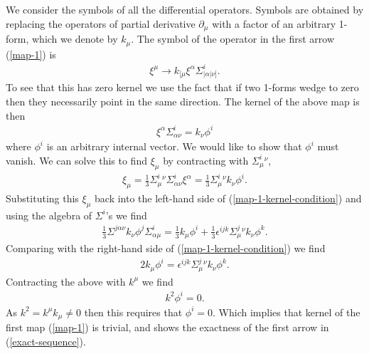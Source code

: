 \documentclass[10pt]{report}
\theoremstyle{definition}
\begin{document}
We consider the symbols of all the differential operators. Symbols are obtained by replacing the operators of partial derivative $\partial_\mu$ with a factor of an arbitrary 1-form, which we denote by $k_\mu$. The symbol of the operator in the first arrow (\ref{map-1}) is
\begin{align}
\xi^\mu \to k_{[\mu} \xi^\alpha \Sigma^i_{|\alpha|\nu]}.
\end{align}
To see that this has zero kernel we use the fact that if two 1-forms wedge to zero then they necessarily point in the same direction. The kernel of the above map is then 
\begin{align}\label{map-1-kernel-condition}
\xi^\alpha \Sigma^i_{\alpha\nu} = k_\nu \phi^i
\end{align}
where $\phi^i$ is an arbitrary internal vector. We would like to show that $\phi^i$ must vanish. 
We can solve this to find $\xi_\mu$ by contracting with $\Sigma^i_\mu{}^\nu$,
\begin{align}
\xi_\mu = \frac{1}{3} \Sigma^i_\mu{}^\nu \Sigma^i_{\alpha\nu} \xi^\alpha = \frac{1}{3} \Sigma^i_\mu{}^\nu k_\nu \phi^i.
\end{align}
Substituting this $\xi_\mu$ back into the left-hand side of (\ref{map-1-kernel-condition}) and using the algebra of $\Sigma^i$'s we find 
\begin{align}
\frac{1}{3} \Sigma^{j\alpha\nu} k_\nu \phi^j \Sigma^i_{\alpha\mu} = \frac{1}{3} k_\mu \phi^i + \frac{1}{3} \epsilon^{ijk} \Sigma^j_\mu{}^\nu k_\nu \phi^k.
\end{align}
Comparing with the right-hand side of (\ref{map-1-kernel-condition}) we find 
\begin{align}
2 k_\mu \phi^i = \epsilon^{ijk} \Sigma^j_\mu{}^\nu k_\nu \phi^k.
\end{align}
Contracting the above with $k^\mu$ we find 
\begin{align}
k^2 \phi^i = 0.
\end{align}
As $k^2 = k^\mu k_\mu \neq 0$ then this requires that $\phi^i = 0$.
Which implies that kernel of the first map (\ref{map-1}) is trivial, and 
shows the exactness of the first arrow in (\ref{exact-sequence}). 
\end{document}
